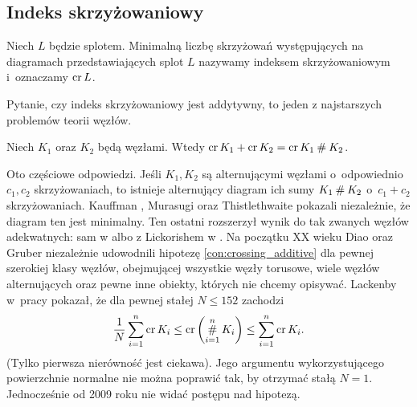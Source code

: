 
\subsection{Indeks skrzyżowaniowy}
%
\begin{definition}
    Niech $L$ będzie splotem.
    Minimalną liczbę skrzyżowań występujących na diagramach przedstawiających splot $L$ nazywamy indeksem skrzyżowaniowym i~oznaczamy $\operatorname{cr} L$.
\end{definition}

Pytanie, czy indeks skrzyżowaniowy jest addytywny, to jeden z najstarszych problemów teorii węzłów.

\begin{conjecture}
%
%
\label{con:crossing_additive}%
    Niech $K_1$ oraz $K_2$ będą węzłami.
    Wtedy $\operatorname{cr} K_1 + \operatorname{cr} K_2 = \operatorname{cr} K_1 \mathbin{\#} K_2$.
\end{conjecture}

Oto częściowe odpowiedzi.
Jeśli $K_1, K_2$ są alternującymi węzłami o~odpowiednio $c_1, c_2$ skrzyżowaniach, to istnieje alternujący diagram ich sumy $K_1 \mathbin{\#} K_2$ o~$c_1 + c_2$ skrzyżowaniach.
%
Kauffman \cite[twierdzenie 2.10]{kauffman87}, Murasugi \cite[wniosek 6]{murasugi87} oraz Thistlethwaite \cite[wniosek 1]{thistlethwaite87} pokazali niezależnie, że diagram ten jest minimalny.
Ten ostatni rozszerzył wynik do tak zwanych węzłów adekwatnych: sam w \cite{thistlethwaite88} albo z Lickorishem w \cite{lickorish88}.
%
Na początku XX wieku Diao \cite{diao04} oraz Gruber \cite{gruber03} niezależnie udowodnili hipotezę \ref{con:crossing_additive} dla pewnej szerokiej klasy węzłów, obejmującej wszystkie węzły torusowe, wiele węzłów alternujących oraz pewne inne obiekty, których nie chcemy opisywać.
%
Lackenby w~pracy \cite{lackenby09} pokazał, że dla pewnej stałej $N \le 152$ zachodzi
\begin{equation}
    \frac 1 N \sum_{i=1}^n \operatorname{cr}{K_i} \le \operatorname{cr} \left(\operatorname*{\#}_{i=1}^n K_i\right) \le \sum_{i=1}^n \operatorname{cr}{K_i}.
\end{equation}
(Tylko pierwsza nierówność jest ciekawa).
Jego argumentu wykorzystującego powierzchnie normalne nie można poprawić tak, by otrzymać stałą $N = 1$.
Jednocześnie od 2009 roku nie widać postępu nad hipotezą.

%


